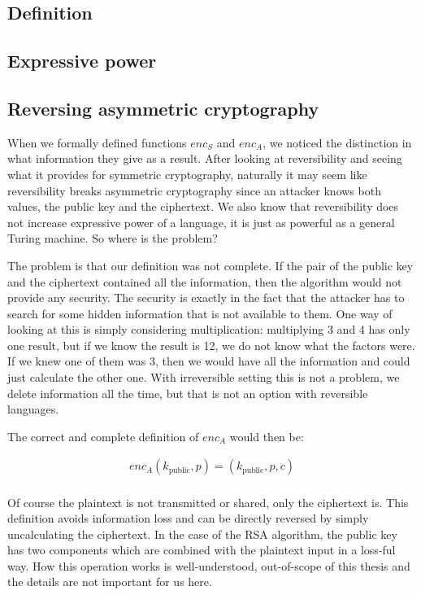 \documentclass[a4paper,10pt,openright]{memoir}
\def\enc{\ensuremath{\mathit{enc}}}
\begin{document}
\subsection{Definition}

\subsection{Expressive power}

\subsection{Reversing asymmetric cryptography}
\label{asym_rev}

When we formally defined functions $\enc_S$ and $\enc_A$, we noticed 
the distinction in what information they give as a result. After 
looking at reversibility and seeing what it provides for symmetric 
cryptography, naturally it may seem like reversibility breaks 
asymmetric cryptography since an attacker knows both values, the public 
key and the ciphertext. We also know that reversibility does not 
increase expressive power of a language, it is just as powerful as a 
general Turing machine. So where is the problem?

The problem is that our definition was not complete. If the pair of the 
public key and the ciphertext contained all the information, then the 
algorithm would not provide any security. The security is exactly in 
the fact that the attacker has to search for some hidden information 
that is not available to them. One way of looking at this is simply 
considering multiplication: multiplying 3 and 4 has only one result, 
but if we know the result is 12, we do not know what the factors were. 
If we knew one of them was 3, then we would have all the information 
and could just calculate the other one. With irreversible setting this 
is not a problem, we delete information all the time, but that is not 
an option with reversible languages.

The correct and complete definition of $\enc_A$ would then be:

\begin{align*}
\enc_A(k_\text{public},p) = (k_\text{public}, p, c) \\
\end{align*}

Of course the plaintext is not transmitted or shared, only the 
ciphertext is. This definition avoids information loss and can be 
directly reversed by simply uncalculating  
the ciphertext. In the case of the RSA algorithm, the public key has 
two components which are combined with the plaintext input in a 
loss-ful way. How this operation works is well-understood, out-of-scope 
of this thesis and the details are not important for us here.
\end{document}
